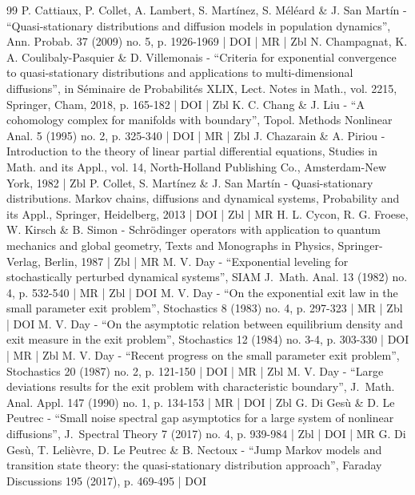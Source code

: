 \begin{thebibliography}{99}
P. Cattiaux, P. Collet, A. Lambert, S. Martínez, S. Méléard \& J. San Martín - “Quasi-stationary distributions and diffusion models in population dynamics”, Ann. Probab. 37 (2009) no. 5, p. 1926-1969 | DOI | MR | Zbl
N. Champagnat, K. A. Coulibaly-Pasquier \& D. Villemonais - “Criteria for exponential convergence to quasi-stationary distributions and applications to multi-dimensional diffusions”, in Séminaire de Probabilités XLIX, Lect. Notes in Math., vol. 2215, Springer, Cham, 2018, p. 165-182 | DOI | Zbl
K. C. Chang \& J. Liu - “A cohomology complex for manifolds with boundary”, Topol. Methods Nonlinear Anal. 5 (1995) no. 2, p. 325-340 | DOI | MR | Zbl
J. Chazarain \& A. Piriou - Introduction to the theory of linear partial differential equations, Studies in Math. and its Appl., vol. 14, North-Holland Publishing Co., Amsterdam-New York, 1982 | Zbl
P. Collet, S. Martínez \& J. San Martín - Quasi-stationary distributions. Markov chains, diffusions and dynamical systems, Probability and its Appl., Springer, Heidelberg, 2013 | DOI | Zbl | MR
H. L. Cycon, R. G. Froese, W. Kirsch \& B. Simon - Schrödinger operators with application to quantum mechanics and global geometry, Texts and Monographs in Physics, Springer-Verlag, Berlin, 1987 | Zbl | MR
M. V. Day - “Exponential leveling for stochastically perturbed dynamical systems”, SIAM J. Math. Anal. 13 (1982) no. 4, p. 532-540 | MR | Zbl | DOI
M. V. Day - “On the exponential exit law in the small parameter exit problem”, Stochastics 8 (1983) no. 4, p. 297-323 | MR | Zbl | DOI
M. V. Day - “On the asymptotic relation between equilibrium density and exit measure in the exit problem”, Stochastics 12 (1984) no. 3-4, p. 303-330 | DOI | MR | Zbl
M. V. Day - “Recent progress on the small parameter exit problem”, Stochastics 20 (1987) no. 2, p. 121-150 | DOI | MR | Zbl
M. V. Day - “Large deviations results for the exit problem with characteristic boundary”, J. Math. Anal. Appl. 147 (1990) no. 1, p. 134-153 | MR | DOI | Zbl
G. Di Gesù \& D. Le Peutrec - “Small noise spectral gap asymptotics for a large system of nonlinear diffusions”, J. Spectral Theory 7 (2017) no. 4, p. 939-984 | Zbl | DOI | MR
G. Di Gesù, T. Lelièvre, D. Le Peutrec \& B. Nectoux - “Jump Markov models and transition state theory: the quasi-stationary distribution approach”, Faraday Discussions 195 (2017), p. 469-495 | DOI

\end{thebibliography}
